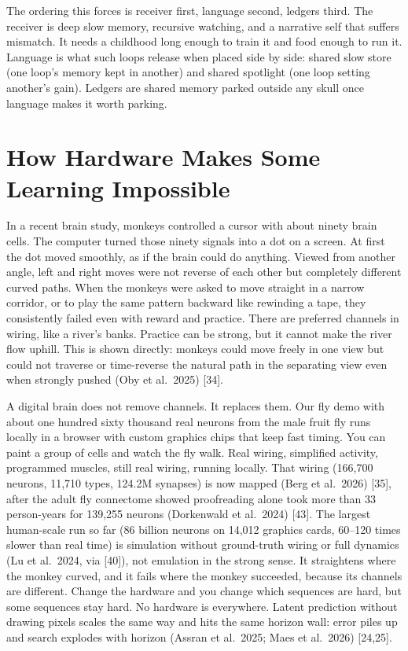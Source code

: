 \documentclass[11pt,a4paper]{article}
\begin{document}
The ordering this forces is receiver first, language second, ledgers third. The receiver is deep slow memory, recursive watching, and a narrative self that suffers mismatch. It needs a childhood long enough to train it and food enough to run it. Language is what such loops release when placed side by side: shared slow store (one loop's memory kept in another) and shared spotlight (one loop setting another's gain). Ledgers are shared memory parked outside any skull once language makes it worth parking.

\section{How Hardware Makes Some Learning Impossible}

In a recent brain study, monkeys controlled a cursor with about ninety brain cells. The computer turned those ninety signals into a dot on a screen. At first the dot moved smoothly, as if the brain could do anything. Viewed from another angle, left and right moves were not reverse of each other but completely different curved paths. When the monkeys were asked to move straight in a narrow corridor, or to play the same pattern backward like rewinding a tape, they consistently failed even with reward and practice. There are preferred channels in wiring, like a river's banks. Practice can be strong, but it cannot make the river flow uphill. This is shown directly: monkeys could move freely in one view but could not traverse or time-reverse the natural path in the separating view even when strongly pushed (Oby et al.\ 2025) [34].

A digital brain does not remove channels. It replaces them. Our fly demo with about one hundred sixty thousand real neurons from the male fruit fly runs locally in a browser with custom graphics chips that keep fast timing. You can paint a group of cells and watch the fly walk. Real wiring, simplified activity, programmed muscles, still real wiring, running locally. That wiring (166,700 neurons, 11,710 types, 124.2M synapses) is now mapped (Berg et al.\ 2026) [35], after the adult fly connectome showed proofreading alone took more than 33 person-years for 139,255 neurons (Dorkenwald et al.\ 2024) [43]. The largest human-scale run so far (86 billion neurons on 14,012 graphics cards, 60--120 times slower than real time) is simulation without ground-truth wiring or full dynamics (Lu et al.\ 2024, via [40]), not emulation in the strong sense. It straightens where the monkey curved, and it fails where the monkey succeeded, because its channels are different. Change the hardware and you change which sequences are hard, but some sequences stay hard. No hardware is everywhere. Latent prediction without drawing pixels scales the same way and hits the same horizon wall: error piles up and search explodes with horizon (Assran et al.\ 2025; Maes et al.\ 2026) [24,25].
\end{document}
